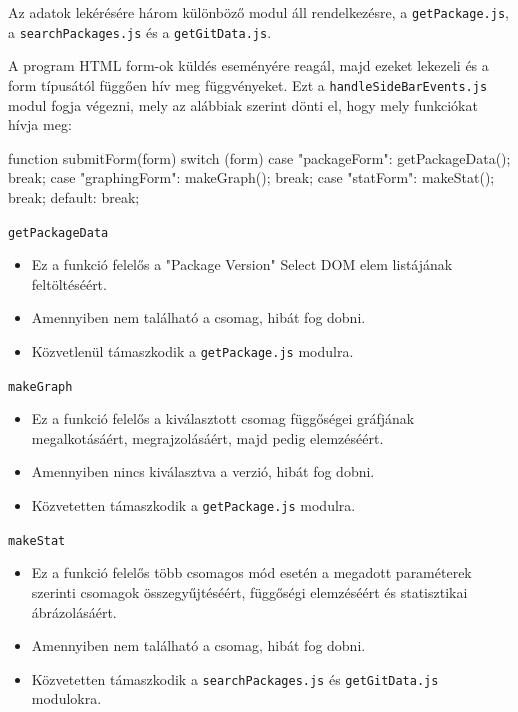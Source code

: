 
Az adatok lekérésére három különböző modul áll rendelkezésre, a \texttt{getPackage.js}, a \texttt{searchPackages.js} és a \texttt{getGitData.js}.

A program HTML form-ok küldés eseményére reagál, majd ezeket lekezeli és a form típusától függően hív meg függvényeket. Ezt a \texttt{handleSideBarEvents.js} modul fogja végezni, mely az alábbiak szerint dönti el, hogy mely funkciókat hívja meg:

\begin{js}
function submitForm(form){
  switch (form) {
    case "packageForm":
      getPackageData();
    break;
    case "graphingForm":
      makeGraph();
    break;
    case "statForm":
      makeStat();
    break;
    default:
    break;
  }
}
\end{js}

\noindent \texttt{getPackageData}
\begin{itemize}
	\item Ez a funkció felelős a "Package Version" Select DOM elem listájának feltöltéséért. 
	\item Amennyiben nem található a csomag, hibát fog dobni.
	\item Közvetlenül támaszkodik a \texttt{getPackage.js} modulra.
\end{itemize}

\noindent \texttt{makeGraph}
\begin{itemize}
	\item Ez a funkció felelős a kiválasztott csomag függőségei gráfjának megalkotásáért, megrajzolásáért, majd pedig elemzéséért.
	\item Amennyiben nincs kiválasztva a verzió, hibát fog dobni.
	\item Közvetetten támaszkodik a \texttt{getPackage.js} modulra.
\end{itemize}

\noindent \texttt{makeStat}
\begin{itemize}
	\item Ez a funkció felelős több csomagos mód esetén a megadott paraméterek szerinti csomagok összegyűjtéséért, függőségi elemzéséért és statisztikai ábrázolásáért.
	\item Amennyiben nem található a csomag, hibát fog dobni.
	\item Közvetetten támaszkodik a \texttt{searchPackages.js} és \texttt{getGitData.js} modulokra.
\end{itemize}

